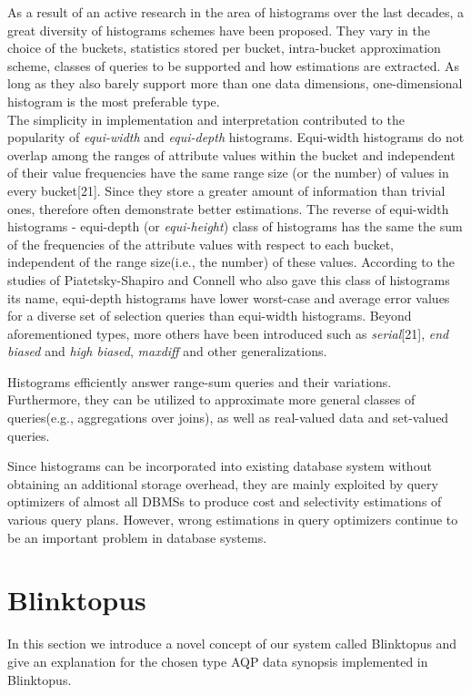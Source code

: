 \documentclass[10pt, conference, compsocconf]{IEEEtran}
\begin{document}
As a result of an active research in the area of histograms over the last decades, a great diversity of histograms schemes have been proposed. They vary in the choice of the buckets, statistics stored per bucket, intra-bucket approximation scheme, classes of queries to be supported and how estimations are extracted. As long as they also barely support more than one data dimensions, one-dimensional histogram is the most preferable type. \\The simplicity in implementation and interpretation contributed to the popularity of \textit{equi-width} and \textit{equi-depth} histograms. Equi-width histograms do not overlap among the ranges of attribute values within the bucket and independent of their value frequencies have the same range size (or the number) of values in every bucket[21]. Since they store a greater amount of information than trivial ones, therefore often demonstrate better estimations. The reverse of equi-width histograms - equi-depth (or \textit{equi-height}) class of histograms has the same the sum of the frequencies of the attribute values with respect to each bucket, independent of the range size(i.e., the number) of these values. According to the studies of Piatetsky-Shapiro and Connell who also gave this class of histograms its name, equi-depth histograms have lower worst-case and average error values for a diverse set of selection queries than equi-width histograms.
Beyond aforementioned types, more others have been introduced such as \textit{serial}[21], \textit{end biased} and \textit{high biased}, \textit{maxdiff} and other generalizations.  

Histograms efficiently answer range-sum queries and their variations. Furthermore, they can be utilized to approximate more general classes of queries(e.g., aggregations over joins), as well as real-valued data and set-valued queries.
  
Since histograms can be incorporated into existing database system without obtaining an additional storage overhead, they are mainly exploited by query optimizers of almost all DBMSs to produce cost and selectivity estimations of various query plans. However, wrong estimations in query optimizers continue to be an important problem in database systems.
 
\section{Blinktopus}
In this section we introduce a novel concept of our system called Blinktopus and give an explanation for the chosen type AQP data synopsis implemented in Blinktopus.  
\end{document}
